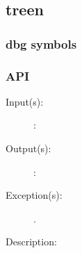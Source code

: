 %
%
%
%
%              

\label{treen}
\subsection{treen}

\subsubsection{dbg symbols}

\subsubsection{API}
\begin{description}
\label{treen_}
\item[{\cfunc[]{treen\_}{}}: ]
	\begin{description}\item[]
	\item[Input(s): ]
		\begin{description}\item[]
		\item[: ]
		\end{description}
	\item[Output(s): ]
		\begin{description}\item[]
		\item[: ]
		\end{description}
	\item[Exception(s): ]
		\begin{description}\item[]
		\item[.]
		\end{description}
	\item[Description: ]
	\end{description}
\end{description}
